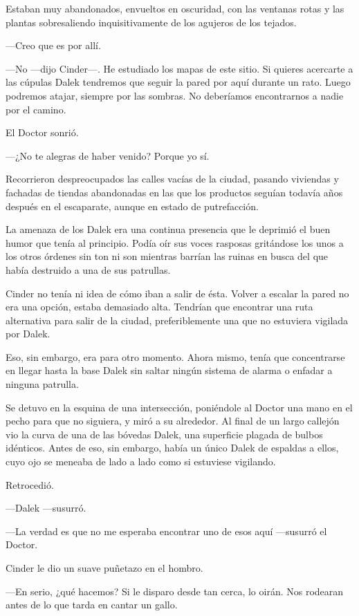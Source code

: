 Estaban muy abandonados, envueltos en oscuridad, con las ventanas rotas y las plantas sobresaliendo inquisitivamente de los agujeros de los tejados.

—Creo que es por allí.

—No —dijo Cinder—. He estudiado los mapas de este sitio. Si quieres acercarte a las cúpulas Dalek tendremos que seguir la pared por aquí durante un rato. Luego podremos atajar, siempre por las sombras. No deberíamos encontrarnos a nadie por el camino.

El Doctor sonrió.

—¿No te alegras de haber venido? Porque yo sí.



Recorrieron despreocupados las calles vacías de la ciudad, pasando viviendas y fachadas de tiendas abandonadas en las que los productos seguían todavía años después en el escaparate, aunque en estado de putrefacción.  

La amenaza de los Dalek era una continua presencia que le deprimió el buen humor que tenía al principio. Podía oír sus voces rasposas gritándose los unos a los otros órdenes sin ton ni son mientras barrían las ruinas en busca del que había destruido a una de sus patrullas.

Cinder no tenía ni idea de cómo iban a salir de ésta. Volver a escalar la pared no era una opción, estaba demasiado alta. Tendrían que encontrar una ruta alternativa para salir de la ciudad, preferiblemente una que no estuviera vigilada por Dalek.

Eso, sin embargo, era para otro momento. Ahora mismo, tenía que concentrarse en llegar hasta la base Dalek sin saltar ningún sistema de alarma o enfadar a ninguna patrulla.

Se detuvo en la esquina de una intersección, poniéndole al Doctor una mano en el pecho para que no siguiera, y miró a su alrededor. Al final de un largo callejón vio la curva de una de las bóvedas Dalek, una superficie plagada de bulbos idénticos. Antes de eso, sin embargo, había un único Dalek de espaldas a ellos, cuyo ojo se meneaba de lado a lado como si estuviese vigilando.

Retrocedió.

—Dalek —susurró.

—La verdad es que no me esperaba encontrar uno de esos aquí —susurró el Doctor.

Cinder le dio un suave puñetazo en el hombro.

—En serio, ¿qué hacemos? Si le disparo desde tan cerca, lo oirán. Nos rodearan antes de lo que tarda en cantar un gallo.

